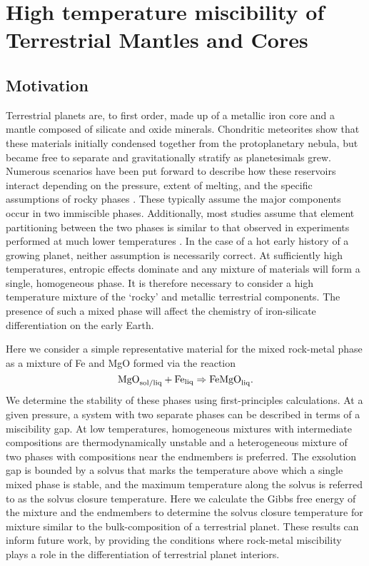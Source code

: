 \chapter{High temperature miscibility of Terrestrial Mantles and Cores}\label{chap6}

\section{Motivation}

Terrestrial planets are, to first order, made up of a metallic iron core and a mantle
composed of silicate and oxide minerals. Chondritic meteorites show that these materials
initially condensed together from the protoplanetary nebula, but became free to separate
and gravitationally stratify as planetesimals grew.  Numerous scenarios have been put
forward to describe how these reservoirs interact depending on the pressure, extent of
melting, and the specific assumptions of rocky phases
\citep{Stevenson1990,Solomatov2007,Rubie2007}. These typically assume the major components
occur in two immiscible phases. Additionally, most studies assume that element
partitioning between the two phases is similar to that observed in experiments performed
at much lower temperatures \citep{Mcdonough1995}. In the case of a hot early history of a
growing planet, neither assumption is necessarily correct. At sufficiently high
temperatures, entropic effects dominate and any mixture of materials will form a single,
homogeneous phase. It is therefore necessary to consider a high temperature mixture of
the `rocky' and metallic terrestrial components. The presence of such a mixed phase will
affect the chemistry of iron-silicate differentiation on the early Earth.

Here we consider a simple representative material for the mixed rock-metal phase as a mixture
of Fe and MgO formed via the reaction
\begin{equation} 
  \rm{MgO}_{\rm sol/liq} + \rm{Fe}_{\rm liq} \Rightarrow \rm{FeMgO}_{\rm liq}.
\end{equation}
We determine the stability of these phases using first-principles calculations.  At a
given pressure, a system with two separate phases can be described in terms of a
miscibility gap. At low temperatures, homogeneous mixtures with intermediate compositions
are thermodynamically unstable and a heterogeneous mixture of two phases with
compositions near the endmembers is preferred. The exsolution gap is bounded by a solvus
that marks the temperature above which a single mixed phase is stable, and the maximum
temperature along the solvus is referred to as the solvus closure temperature. Here we calculate
the Gibbs free energy of the mixture and the endmembers to determine the solvus closure
temperature for mixture similar to the bulk-composition of a terrestrial planet. These
results can inform future work, by providing the conditions where rock-metal miscibility
plays a role in the differentiation of terrestrial planet interiors.


